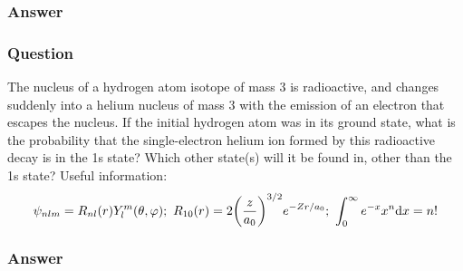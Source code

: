 \subsubsection{Answer}


\subsubsection{Question}
The nucleus of a hydrogen atom isotope of mass 3 is radioactive, and changes suddenly into a helium nucleus of mass 3 with the emission of an electron that escapes the nucleus. If the initial hydrogen atom was in its ground state, what is the probability that the single-electron helium ion formed by this radioactive decay is in the 1s state? Which other state(s) will it be found in, other than the 1s state? Useful information:
\begin{equation*}
	\psi_{nlm} = R_{nl}(r)Y^{m}_{l}(\theta,\varphi);\ R_{10}(r) = 2\qty(\frac{z}{a_0})^{3/2}e^{-Zr/a_0};\ \int_0^\infty e^{-x}x^n\dd x = n!
\end{equation*}
\subsubsection{Answer}


